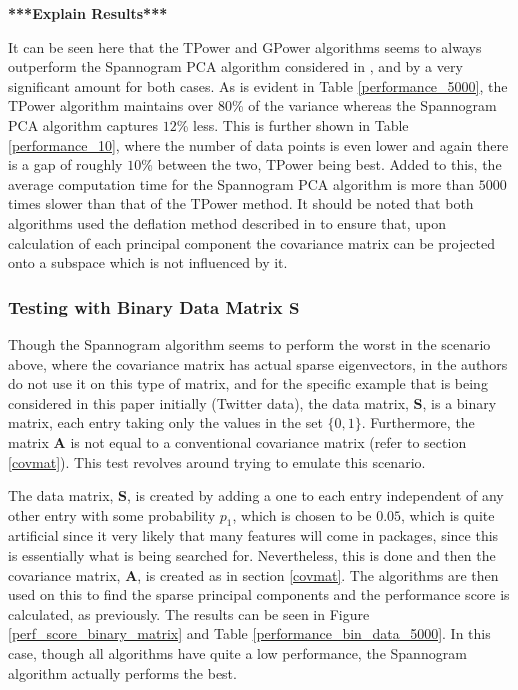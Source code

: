 \documentclass[11pt,a4paper]{article}
\newcommand{\smat}{\mathbf{S}}
\newcommand{\covmat}{\mathbf{A}}
\begin{document}
\textbf{***Explain Results***}

It can be seen here that the TPower and GPower algorithms seems to always outperform the Spannogram PCA algorithm considered in \cite{dimakis}, and by a very significant amount for both cases. As is evident in Table \ref{performance_5000}, the TPower algorithm maintains over $80$\% of the variance whereas the Spannogram PCA algorithm captures $12$\% less. This is further shown in Table \ref{performance_10}, where the number of data points is even lower and again there is a gap of roughly $10$\% between the two, TPower being best. Added to this, the average computation time for the Spannogram PCA algorithm is more than $5000$ times slower than that of the TPower method. It should be noted that both algorithms used the deflation method described in \cite{Mackey_deflationmethods} to ensure that, upon calculation of each principal component the covariance matrix can be projected onto a subspace which is not influenced by it.

\subsubsection{Testing with Binary Data Matrix $\smat$}

Though the Spannogram algorithm seems to perform the worst in the scenario above, where the covariance matrix has actual sparse eigenvectors, in \cite{dimakis} the authors do not use it on this type of matrix, and for the specific example that is being considered in this paper initially (Twitter data), the data matrix, $\smat$, is a binary matrix, each entry taking only the values in the set $\{ 0, 1\}$. Furthermore, the matrix $\covmat$ is not equal to a conventional covariance matrix (refer to section \ref{covmat}). This test revolves around trying to emulate this scenario. 

The data matrix, $\smat$, is created by adding a one to each entry independent of any other entry with some probability $p_\text{1}$, which is chosen to be $0.05$, which is quite artificial since it very likely that many features will come in packages, since this is essentially what is being searched for. Nevertheless, this is done and then the covariance matrix, $\covmat$, is created as in section \ref{covmat}. The algorithms are then used on this to find the sparse principal components and the performance score is calculated, as previously. The results can be seen in Figure \ref{perf_score_binary_matrix} and Table \ref{performance_bin_data_5000}. In this case, though all algorithms have quite a low performance, the Spannogram algorithm actually performs the best. 
\end{document}
